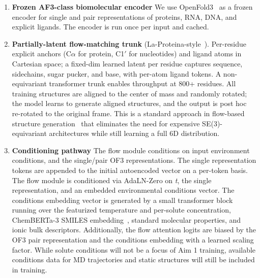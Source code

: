 \documentclass[11pt]{article}
\begin{document}
\begin{enumerate}
\item \textbf{Frozen AF3-class biomolecular encoder} We use OpenFold3~\cite{theopenfold3team_OpenFold3preview_2025} as a frozen encoder for single and pair representations of proteins, RNA, DNA, and explicit ligands. The encoder is run once per input and cached.

\item \textbf{Partially-latent flow-matching trunk} (La-Proteina-style~\cite{geffner_LaProteina_2025}). Per-residue explicit anchors (C$\alpha$ for protein, C1$'$ for nucleotides) and ligand atoms in Cartesian space; a fixed-dim learned latent per residue captures sequence, sidechains, sugar pucker, and base, with per-atom ligand tokens. A non-equivariant transformer trunk enables throughput at 800+ residues. All training structures are aligned to the center of mass and randomly rotated; the model learns to generate aligned structures, and the output is post hoc re-rotated to the original frame. This is a standard approach in flow-based structure generation~\cite{lewis_Scalable_2025,janson_Deep_2025a,geffner_LaProteina_2025} that eliminates the need for expensive SE(3)-equivariant architectures while still learning a full 6D distribution.

\item \textbf{Conditioning pathway} The flow module conditions on input environment conditions, and the single/pair OF3 representations. The single representation tokens are appended to the initial autoencoded vector on a per-token basis. The flow module is conditioned via AdaLN-Zero on \textit{t}, the single representation, and an embedded environmental conditions vector. The conditions embedding vector is generated by a small transformer block running over the featurized temperature and per-solute concentration, ChemBERTa-3 SMILES embedding~\cite{singh_ChemBERTa3_2025}, standard molecular properties, and ionic bulk descriptors. Additionally, the flow attention logits are biased by the OF3 pair representation and the conditions embedding with a learned scaling factor. While solute conditions will not be a focus of Aim 1 training, available conditions data for MD trajectories and static structures will still be included in training.


\end{enumerate}
\end{document}
